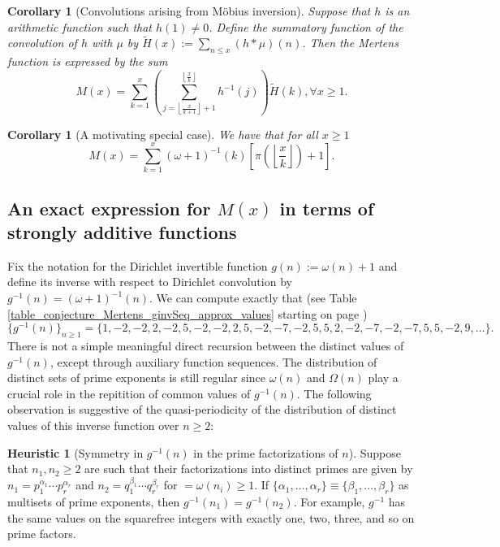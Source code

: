 \documentclass[11pt,reqno,a4letter]{article}
\numberwithin{figure}{section}
\numberwithin{table}{section}
\newcommand{\floor}[1]{\left\lfloor #1 \right\rfloor}
\newcommand{\Floor}[2]{\ensuremath{\left\lfloor \frac{#1}{#2} \right\rfloor}}
\theoremstyle{plain}
\newtheorem{cor}[theorem]{Corollary}
\numberwithin{theorem}{section}
\theoremstyle{definition}
\newtheorem{heuristic}[theorem]{Heuristic}
\begin{document}
\begin{cor}[Convolutions arising from M\"obius inversion] 
\label{cor_CvlGAstMu} 
Suppose that $h$ is an arithmetic function such that 
$h(1) \neq 0$. Define the summatory function of 
the convolution of $h$ with $\mu$ by $\widetilde{H}(x) := \sum_{n \leq x} (h \ast \mu)(n)$. 
Then the Mertens function is expressed by the sum 
\[
M(x) = \sum_{k=1}^{x} \left(\sum_{j=\floor{\frac{x}{k+1}}+1}^{\floor{\frac{x}{k}}} h^{-1}(j)\right) 
     \widetilde{H}(k), \forall x \geq 1. 
\]
\end{cor} 

\begin{cor}[A motivating special case] 
\label{cor_Mx_gInvnPixk_formula} 
We have that for all $x \geq 1$ 
\begin{equation} 
\label{eqn_Mx_gInvnPixk_formula} 
M(x) = \sum_{k=1}^{x} (\omega+1)^{-1}(k) \left[\pi\left(\Floor{x}{k}\right) + 1\right]. 
\end{equation} 
\end{cor} 

\subsection{An exact expression for $M(x)$ in terms of strongly additive functions} 
\label{example_InvertingARecRelForMx_Intro}

Fix the notation for the Dirichlet invertible function $g(n) := \omega(n) + 1$ and define its 
inverse with respect to Dirichlet convolution by $g^{-1}(n) = (\omega+1)^{-1}(n)$. 
We can compute exactly that 
(see Table \ref{table_conjecture_Mertens_ginvSeq_approx_values} starting on page 
\pageref{table_conjecture_Mertens_ginvSeq_approx_values}) 
\[
\{g^{-1}(n)\}_{n \geq 1} = \{1, -2, -2, 2, -2, 5, -2, -2, 2, 5, -2, -7, -2, 5, 5, 2, -2, -7, -2, 
     -7, 5, 5, -2, 9, \ldots \}. 
\] 
There is not a simple meaningful 
direct recursion between the distinct values of $g^{-1}(n)$, except 
through auxiliary function sequences. 
The distribution of distinct sets of prime exponents is still regular since 
$\omega(n)$ and $\Omega(n)$ play a crucial role in the repitition of common values of 
$g^{-1}(n)$. 
The following observation is suggestive of the quasi-periodicity of the distribution of 
distinct values of this inverse function over $n \geq 2$: 

\begin{heuristic}[Symmetry in $g^{-1}(n)$ in the prime factorizations of $n$] 
\label{heuristic_SymmetryIngInvFuncs} 
Suppose that $n_1, n_2 \geq 2$ are such that their factorizations into distinct primes are 
given by $n_1 = p_1^{\alpha_1} \cdots p_r^{\alpha_r}$ and $n_2 = q_1^{\beta_1} \cdots q_r^{\beta_r}$ 
for $ = \omega(n_i) \geq 1$. 
If $\{\alpha_1, \ldots, \alpha_r\} \equiv \{\beta_1, \ldots, \beta_r\}$ as multisets of prime exponents, 
then $g^{-1}(n_1) = g^{-1}(n_2)$. For example, $g^{-1}$ has the same values on the squarefree integers 
with exactly one, two, three, and so on prime factors.  
\end{heuristic} 
\end{document}
